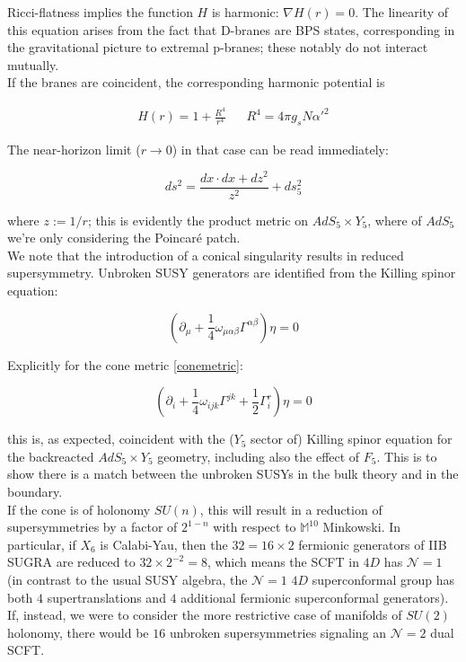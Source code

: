 Ricci-flatness implies the function $H$ is harmonic: $\nabla H(r) = 0$. The linearity of this equation arises from the fact that D-branes are BPS states, corresponding in the gravitational picture to extremal p-branes; these notably do not interact mutually.\\

If the branes are coincident, the corresponding harmonic potential is

\begin{align}
 H(r) = 1 + \frac{R^4}{r^4} && R^4 = 4 \pi g_s N \alpha'^2 
\end{align}

The near-horizon limit ($r\rightarrow 0$) in that case can be read immediately:

\begin{equation}
ds^2 = \frac{ dx \cdot dx + dz^2}{z^2} + ds_5^2
\end{equation}

where $z := 1/r$; this is evidently the product metric on $AdS_5 \times Y_5$, where of $AdS_5$ we're only considering the Poincaré patch. \\

We note that the introduction of a conical singularity results in reduced supersymmetry. Unbroken SUSY generators are identified from the Killing spinor equation:

\begin{equation}
	\left(\partial_\mu + \frac{1}{4} \omega_{\mu\alpha\beta} \Gamma^{\alpha\beta} \right) \eta = 0
\end{equation}

Explicitly for the cone metric \ref{conemetric}:

\begin{equation}
	\left(\partial_i + \frac{1}{4} \omega_{ijk} \Gamma^{jk} + \frac{1}{2} \Gamma^r_i \right) \eta = 0
\end{equation}

this is, as expected, coincident with the ($Y_5$ sector of) Killing spinor equation for the backreacted $AdS_5 \times Y_5$ geometry, including also the effect of $F_5$. This is to show there is a match between the unbroken SUSYs in the bulk theory and in the boundary.\\

If the cone is of holonomy $SU(n)$, this will result in a reduction of supersymmetries by a factor of $2^{1-n}$ with respect to $\mathbb{M}^{10}$ Minkowski. In particular, if $X_6$ is Calabi-Yau, then the $32 = 16 \times 2$ fermionic generators of IIB SUGRA are reduced to $32 \times 2^{-2} = 8$, which means the SCFT in $4D$ has $\mathcal{N}=1$ (in contrast to the usual SUSY algebra, the $\mathcal{N}=1$ $4D$ superconformal group has both $4$ supertranslations and $4$ additional fermionic superconformal generators). If, instead, we were to consider the more restrictive case of manifolds of $SU(2)$ holonomy, there would be $16$ unbroken supersymmetries signaling an $\mathcal{N}=2$ dual SCFT.

